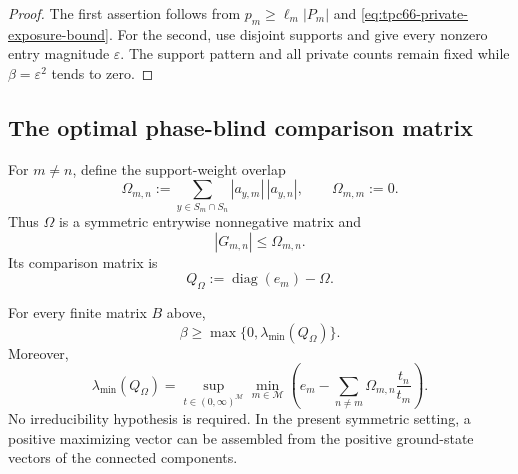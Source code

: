 \begin{proof}
The first assertion follows from
\(p_m\ge\ell_m|P_m|\) and
\eqref{eq:tpc66-private-exposure-bound}.  For the second, use disjoint
supports and give every nonzero entry magnitude \(\varepsilon\).  The
support pattern and all private counts remain fixed while
\(\beta=\varepsilon^2\) tends to zero.
\end{proof}

\subsection{The optimal phase-blind comparison matrix}

For \(m\ne n\), define the support-weight overlap
\begin{equation}
 \Omega_{m,n}
 :=
 \sum_{y\in S_m\cap S_n}|a_{y,m}|\,|a_{y,n}|,
 \qquad
 \Omega_{m,m}:=0.
 \label{eq:tpc66-overlap-envelope}
\end{equation}
Thus \(\Omega\) is a symmetric entrywise nonnegative matrix and
\begin{equation}
 |G_{m,n}|\le\Omega_{m,n}.
 \label{eq:tpc66-entry-overlap-bound}
\end{equation}
Its comparison matrix is
\begin{equation}
 Q_\Omega:=\operatorname{diag}(e_m)-\Omega.
 \label{eq:tpc66-comparison-matrix}
\end{equation}

\begin{theorem}
\label{thm:tpc66-optimal-comparison}
For every finite matrix \(B\) above,
\begin{equation}
 \boxed{
 \beta\ge
 \max\{0,\lambda_{\min}(Q_\Omega)\}.}
 \label{eq:tpc66-comparison-lower-bound}
\end{equation}
Moreover,
\begin{equation}
 \boxed{
 \lambda_{\min}(Q_\Omega)
 =
 \sup_{t\in(0,\infty)^{\mathcal M}}
 \min_{m\in\mathcal M}
 \left(
 e_m-\sum_{n\ne m}
 \Omega_{m,n}\frac{t_n}{t_m}
 \right).}
 \label{eq:tpc66-collatz-wielandt-comparison}
\end{equation}
No irreducibility hypothesis is required.  In the present symmetric setting,
a positive maximizing vector can be assembled from the positive ground-state
vectors of the connected components.
\end{theorem}

